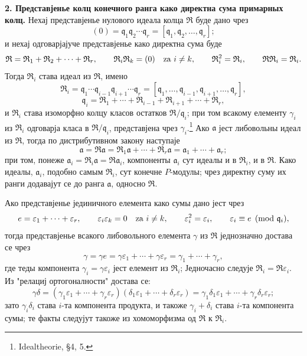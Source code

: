 \documentclass[11pt]{article}
\begin{document}
\setcounter{footnote}{19}

\textbf{2. Представјенье колц конечного ранга како директна сума примарных колц.} Нехај представјенье нулового идеала колца $\mathfrak R$ буде дано чрез
\[
   (0)=\mathfrak q_1\mathfrak q_2\cdots\mathfrak q_r
      =[\mathfrak q_1,\mathfrak q_2,\ldots,\mathfrak q_r];
\]
и нехај одговарјајуче представјенье како директна сума буде
\[
   \mathfrak R=\mathfrak R_1+\mathfrak R_2+\cdots+\mathfrak R_r,
   \qquad
   \mathfrak R_i\mathfrak R_k=(0)\quad\hbox{za } i\ne k,
   \qquad
   \mathfrak R_i^2=\mathfrak R_i,
   \qquad
   \mathfrak R\mathfrak R_i=\mathfrak R_i.
\]
Тогда $\mathfrak R_i$ става идеал из $\mathfrak R$, имено
\[
   \mathfrak R_i
   =\mathfrak q_1\cdots\mathfrak q_{i-1}\mathfrak q_{i+1}\cdots\mathfrak q_r
   =[\mathfrak q_1,\ldots,\mathfrak q_{i-1},\mathfrak q_{i+1},\ldots,\mathfrak q_r],
\]
\[
   \mathfrak q_i=\mathfrak R_1+\cdots+\mathfrak R_{i-1}+\mathfrak R_{i+1}+\cdots+\mathfrak R_r,
\]
и $\mathfrak R_i$ става изоморфно колцу класов остатков $\mathfrak R/\mathfrak q_i$; при том всакому елементу $\gamma_i$ из $\mathfrak R_i$ одговарја класа в $\mathfrak R/\mathfrak q_i$, представјена чрез $\gamma_i$.\footnote{Idealtheorie, \S 4, 5.} Ако $\mathfrak a$ јест либовольны идеал из $\mathfrak R$, тогда по дистрибутивном закону наступаје
\[
   \mathfrak a=\mathfrak R\mathfrak a
   =\mathfrak R_1\mathfrak a+\cdots+\mathfrak R_r\mathfrak a
   =\mathfrak a_1+\cdots+\mathfrak a_r;
\]
при том, понеже $\mathfrak a_i=\mathfrak R_i\mathfrak a=\mathfrak R\mathfrak a_i$, компоненты $\mathfrak a_i$ сут идеалы и в $\mathfrak R_i$, и в $\mathfrak R$. Како идеалы, $\mathfrak a_i$, подобно самым $\mathfrak R_i$, сут конечне $P$-модулы; чрез директну суму их ранги додавајут се до ранга $\mathfrak a$, односно $\mathfrak R$.

Ако представјенье јединичного елемента како сумы дано јест чрез
\[
   e=\varepsilon_1+\cdots+\varepsilon_r,
   \qquad
   \varepsilon_i\varepsilon_k=0\quad\hbox{za } i\ne k,
   \qquad
   \varepsilon_i^2=\varepsilon_i,
   \qquad
   \varepsilon_i\equiv e\pmod{\mathfrak q_i},
\]
тогда представјенье всакого либовольного елемента $\gamma$ из $\mathfrak R$ једнозначно достава се чрез
\[
   \gamma=\gamma e=\gamma\varepsilon_1+\cdots+\gamma\varepsilon_r
      =\gamma_1+\cdots+\gamma_r,
\]
где теды компонента $\gamma_i=\gamma\varepsilon_i$ јест елемент из $\mathfrak R_i$; Једночасно следује $\mathfrak R_i=\mathfrak R\varepsilon_i$. Из "релациј ортогоналности" достава се:
\[
   \gamma\delta=(\gamma_1\varepsilon_1+\cdots+\gamma_r\varepsilon_r)
      (\delta_1\varepsilon_1+\cdots+\delta_r\varepsilon_r)
   =\gamma_1\delta_1\varepsilon_1+\cdots+\gamma_r\delta_r\varepsilon_r;
\]
зато $\gamma_i\delta_i$ става $i$-та компонента продукта, и такоже $\gamma_i+\delta_i$ става $i$-та компонента сумы; те факты следујут такоже из хомоморфизма од $\mathfrak R$ к $\mathfrak R_i$.
\end{document}
